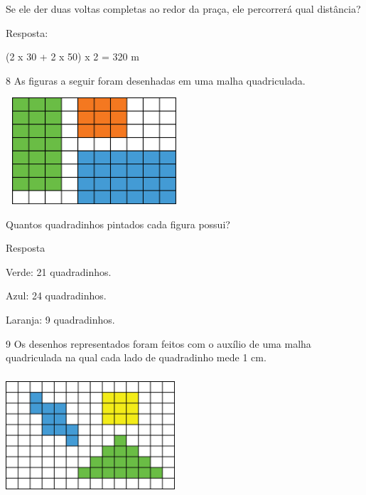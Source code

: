 \begin{multicols}{2}
Se ele der duas voltas completas ao redor da praça, ele percorrerá qual distância?


Resposta:

(2 x 30 + 2 x 50) x 2 = 320 m


\num{8} As figuras a seguir foram desenhadas em uma malha quadriculada.


\includegraphics[width=2.59189in,height=1.55847in]{media/image56.png}

Quantos quadradinhos pintados cada figura possui?


Resposta

Verde: 21 quadradinhos.

Azul: 24 quadradinhos.

Laranja: 9 quadradinhos.

\num{9} Os desenhos representados foram feitos com o auxílio de uma malha
quadriculada na qual cada lado de quadradinho mede 1 cm.


\includegraphics[width=2.47521in,height=1.77515in]{media/image57.png}

\begin{escolha}


\end{escolha}
\end{multicols}
